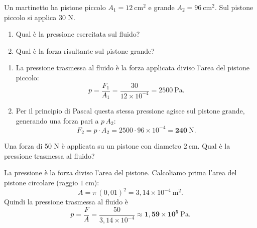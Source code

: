 \begin{question}[ID=4.1, subtitle={Pressione e forza su martinetto con aree 12 e 96 cm²}, tags={fluidi, Pascal, martinetto}, difficulty=facile]
Un martinetto ha pistone piccolo $A_1 = 12\ \mathrm{cm^2}$ e grande $A_2 = 96\ \mathrm{cm^2}$. Sul pistone piccolo si applica 30 N.
\begin{enumerate}
    \item Qual è la pressione esercitata sul fluido?
    \item Qual è la forza risultante sul pistone grande?
\end{enumerate}
\begin{solution}
\begin{enumerate}
    \item La pressione trasmessa al fluido è la forza applicata diviso l'area del pistone piccolo:
    \[
    p = \frac{F_1}{A_1} = \frac{30}{12\times10^{-4}} = 2500\ \mathrm{Pa}.
    \]
    \item Per il principio di Pascal questa stessa pressione agisce sul pistone grande, generando una forza pari a $p\,A_2$:
    \[
    F_2 = p\cdot A_2 = 2500\cdot 96\times10^{-4} = \mathbf{240\ \mathrm{N}}.
    \]
\end{enumerate}
\end{solution}
\end{question}


\begin{question}[ID=4.2, subtitle={Pressione trasmessa da forza su pistone circolare}, tags={fluidi, Pascal}, difficulty=facile]
Una forza di 50 N è applicata su un pistone con diametro $2\ \mathrm{cm}$. Qual è la pressione trasmessa al fluido?
\begin{solution}
La pressione è la forza diviso l'area del pistone. Calcoliamo prima l'area del pistone circolare (raggio $1\ \mathrm{cm}$):
\[
A = \pi\,(0{,}01)^2 = 3{,}14\times10^{-4}\ \mathrm{m^2}.
\]
Quindi la pressione trasmessa al fluido è
\[
p = \frac{F}{A} = \frac{50}{3{,}14\times10^{-4}} \approx \mathbf{1{,}59\times10^{5}\ \mathrm{Pa}}.
\]
\end{solution}
\end{question}


